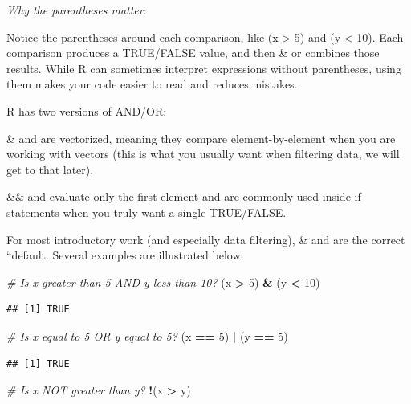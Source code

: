 \documentclass[
  11pt,
]{article}
\newenvironment{Shaded}{\begin{snugshade}}{\end{snugshade}}
\newcommand{\CommentTok}[1]{\textcolor[rgb]{0.56,0.35,0.01}{\textit{#1}}}
\newcommand{\DecValTok}[1]{\textcolor[rgb]{0.00,0.00,0.81}{#1}}
\newcommand{\NormalTok}[1]{#1}
\newcommand{\SpecialCharTok}[1]{\textcolor[rgb]{0.81,0.36,0.00}{\textbf{#1}}}
\begin{document}
\emph{Why the parentheses matter}:

Notice the parentheses around each comparison, like (x \textgreater{} 5)
and (y \textless{} 10). Each comparison produces a TRUE/FALSE value, and
then \& or \textbar{} combines those results. While R can sometimes
interpret expressions without parentheses, using them makes your code
easier to read and reduces mistakes.

R has two versions of AND/OR:

\& and \textbar{} are vectorized, meaning they compare
element-by-element when you are working with vectors (this is what you
usually want when filtering data, we will get to that later).

\&\& and \textbar\textbar{} evaluate only the first element and are
commonly used inside if statements when you truly want a single
TRUE/FALSE.

For most introductory work (and especially data filtering), \& and
\textbar{} are the correct ``default. Several examples are illustrated
below.

\begin{Shaded}
\begin{Highlighting}[]
\CommentTok{\# Is x greater than 5 AND y less than 10?}
\NormalTok{(x }\SpecialCharTok{\textgreater{}} \DecValTok{5}\NormalTok{) }\SpecialCharTok{\&}\NormalTok{ (y }\SpecialCharTok{\textless{}} \DecValTok{10}\NormalTok{)}
\end{Highlighting}
\end{Shaded}

\begin{verbatim}
## [1] TRUE
\end{verbatim}

\begin{Shaded}
\begin{Highlighting}[]
\CommentTok{\# Is x equal to 5 OR y equal to 5?}
\NormalTok{(x }\SpecialCharTok{==} \DecValTok{5}\NormalTok{) }\SpecialCharTok{|}\NormalTok{ (y }\SpecialCharTok{==} \DecValTok{5}\NormalTok{)}
\end{Highlighting}
\end{Shaded}

\begin{verbatim}
## [1] TRUE
\end{verbatim}

\begin{Shaded}
\begin{Highlighting}[]
\CommentTok{\# Is x NOT greater than y?}
\SpecialCharTok{!}\NormalTok{(x }\SpecialCharTok{\textgreater{}}\NormalTok{ y)}
\end{Highlighting}
\end{Shaded}
\end{document}
